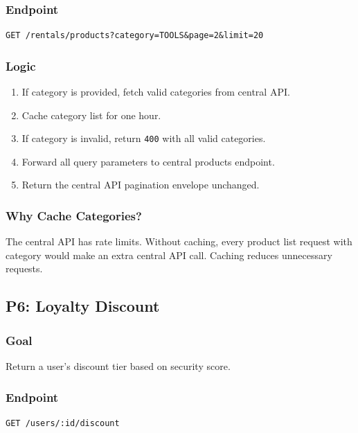 \documentclass[11pt,a4paper]{article}
\begin{document}
\subsubsection*{Endpoint}

\begin{lstlisting}
GET /rentals/products?category=TOOLS&page=2&limit=20
\end{lstlisting}

\subsubsection*{Logic}

\begin{enumerate}
  \item If category is provided, fetch valid categories from central API.
  \item Cache category list for one hour.
  \item If category is invalid, return \texttt{400} with all valid categories.
  \item Forward all query parameters to central products endpoint.
  \item Return the central API pagination envelope unchanged.
\end{enumerate}

\subsubsection*{Why Cache Categories?}

The central API has rate limits. Without caching, every product list request with category would make an extra central API call. Caching reduces unnecessary requests.

\subsection{P6: Loyalty Discount}

\subsubsection*{Goal}
Return a user's discount tier based on security score.

\subsubsection*{Endpoint}

\begin{lstlisting}
GET /users/:id/discount
\end{lstlisting}
\end{document}
